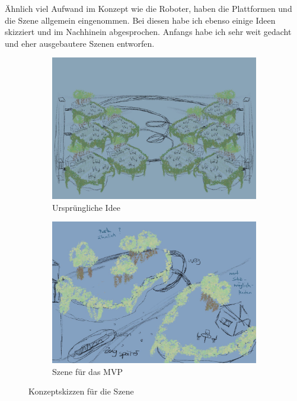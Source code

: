 Ähnlich viel Aufwand im Konzept wie die Roboter, haben die Plattformen und die Szene allgemein eingenommen. Bei diesen habe ich ebenso einige Ideen skizziert und im Nachhinein abgesprochen. Anfangs habe ich sehr weit gedacht und eher ausgebautere Szenen entworfen. 
\begin{figure}[H]
	\begin{subfigure}{0.5\textwidth}
		\centering
		\includegraphics[height=0.3\pageheight,keepaspectratio]{pics/3} 
		\caption{Ursprüngliche Idee}
	\end{subfigure}	
	\begin{subfigure}{0.5\textwidth}
		\centering
		\includegraphics[height=0.3\pageheight,keepaspectratio]{pics/4} 
		\caption{Szene für das MVP}
	\end{subfigure}	
	\caption{Konzeptskizzen für die Szene}
\end{figure}
